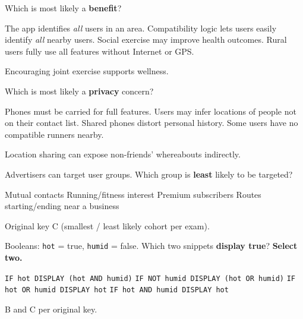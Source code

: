 \question[5]
\runroutrstem

Which is most likely a \textbf{benefit}?
\begin{choices}
  \choice The app identifies \emph{all} users in an area.
  \choice Compatibility logic lets users easily identify \emph{all} nearby users.
  \CorrectChoice Social exercise may improve health outcomes.
  \choice Rural users fully use all features without Internet or GPS.
\end{choices}
\begin{solution}
  Encouraging joint exercise supports wellness.
\end{solution}



\question[5]
\runroutrstem

Which is most likely a \textbf{privacy} concern?
\begin{choices}
  \choice Phones must be carried for full features.
  \CorrectChoice Users may infer locations of people not on their contact list.
  \choice Shared phones distort personal history.
  \choice Some users have no compatible runners nearby.
\end{choices}
\begin{solution}
  Location sharing can expose non-friends' whereabouts indirectly.
\end{solution}

\question[5]
\runroutrstem

Advertisers can target user groups. Which group is \textbf{least} likely to be targeted?
\begin{choices}
  \choice Mutual contacts
  \choice Running/fitness interest
  \CorrectChoice Premium subscribers
  \choice Routes starting/ending near a business
\end{choices}
\begin{solution}
  Original key C (smallest / least likely cohort per exam).
\end{solution}





\question[5]
Booleans: \texttt{hot} = true, \texttt{humid} = false. Which two snippets \textbf{display true}? \textbf{Select two.}
\begin{checkboxes}
  \choice \texttt{IF hot DISPLAY (hot AND humid)}
  \CorrectChoice \texttt{IF NOT humid DISPLAY (hot OR humid)}
  \CorrectChoice \texttt{IF hot OR humid DISPLAY hot}
  \choice \texttt{IF hot AND humid DISPLAY hot}
\end{checkboxes}
\begin{solution}
  B and C per original key.
\end{solution}

